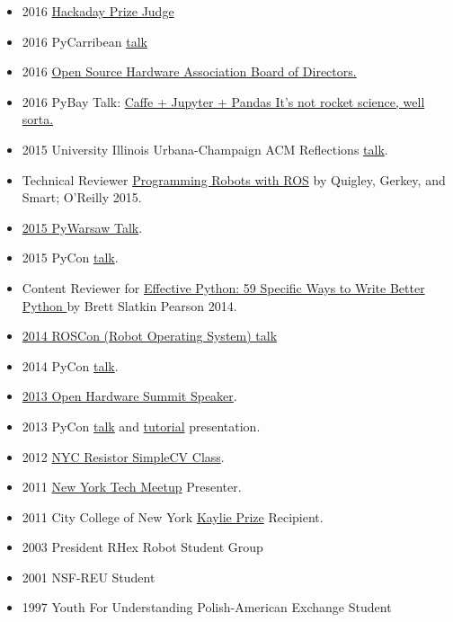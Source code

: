 \documentclass[10pt]{article}
\newenvironment{outerlist}[1][\enskip\textbullet]%
        {\begin{itemize}[#1]}{\end{itemize}%
         \vspace{-.6\baselineskip}}
\begin{document}
\begin{outerlist}
\item 2016 \href{https://hackaday.io/prize}{Hackaday Prize Judge} 
\item 2016 PyCarribean \href{http://pycaribbean.com/}{talk} 
\item 2016 \href{http://www.oshwa.org/about/board-members/}{Open Source Hardware Association Board of Directors.}
\item 2016 PyBay Talk: \href{https://www.youtube.com/watch?v=h5Zhk0U4aZ4}{Caffe + Jupyter + Pandas It’s not rocket science, well sorta.}
\item 2015 University Illinois Urbana-Champaign ACM Reflections \href{https://www-s.acm.illinois.edu/conference/2015/}{talk}.
\item Technical Reviewer \href{http://www.amazon.com/Programming-Robots-ROS-Practical-Introduction/dp/1449323898/ref=sr_1_1?ie=UTF8&qid=1453504302&sr=8-1&keywords=ROS+o%27reilly}{Programming Robots with ROS} by Quigley, Gerkey, and Smart; O'Reilly 2015. 
\item \href{http://summit.pywaw.org/2015/}{2015 PyWarsaw Talk}.
\item 2015 PyCon \href{https://www.youtube.com/watch?v=Wf0Uhebn2cM&ab_channel=PyCon2015}{talk}.
\item Content Reviewer for \href{http://smile.amazon.com/Effective-Python-Specific-Software-Development/dp/0134034287/ref=sr_1_1?ie=UTF8&qid=1453504025&sr=8-1&keywords=effective+python}{Effective Python: 59 Specific Ways to Write Better Python } by Brett Slatkin Pearson 2014.
\item \href{http://roscon.ros.org/2014/}{2014 ROSCon (Robot Operating System) talk}
\item 2014 PyCon \href{https://www.youtube.com/watch?v=grMfIoDgn9M&ab_channel=PyCon2014}{talk}.
\item \href{http://2013.oshwa.org/schedule/}{2013 Open Hardware Summit Speaker}.
\item 2013 PyCon \href{http://www.youtube.com/watch?v=UZSm7Q2bZoc&}{talk} and \href{http://www.youtube.com/watch?v=UZSm7Q2bZoc&}{tutorial} presentation.
\item 2012 \href{http://www.nycresistor.com/2012/02/29/tickets-still-available-for-this-amazing-new-class-this-sunday/}{NYC Resistor SimpleCV Class}.
\item 2011 \href{http://vimeo.com/28723189#t=4534}{New York Tech Meetup} Presenter.
\item 2011 City College of New York \href{http://entrepreneurship.ccny.cuny.edu/kaylieprize}{Kaylie Prize} Recipient.
\item 2003 President RHex Robot Student Group
\item 2001 NSF-REU Student
\item 1997 Youth For Understanding Polish-American Exchange Student
\end{outerlist}
\end{document}
